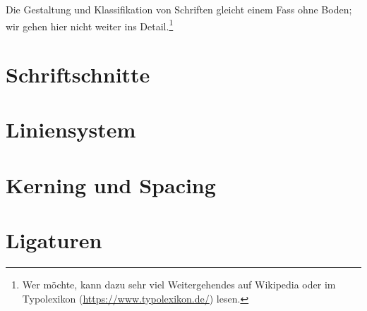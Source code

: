 Die Gestaltung und Klassifikation von Schriften gleicht einem Fass
ohne Boden; wir gehen hier nicht weiter ins Detail.\footnote{Wer
  möchte, kann dazu sehr viel Weitergehendes auf Wikipedia oder im
  Typo\-lexikon (\url{https://www.typolexikon.de/}) lesen.}


\section{Schriftschnitte}
\label{sec:Schnitte}


\section{Liniensystem}
\label{sec:Linien}




\section{Kerning und Spacing}
\label{sec:KernSpace}


\section{Ligaturen}


